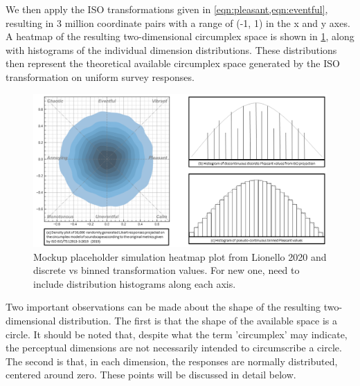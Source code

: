 We then apply the ISO transformations given in \cref{eqn:pleasant,eqn:eventful}, resulting in 3 million coordinate pairs with a range of (-1, 1) in the x and y axes. A heatmap of the resulting two-dimensional circumplex space is shown in \cref{fig:isoheatmap}, along with histograms of the individual dimension distributions. These distributions then represent the theoretical available circumplex space generated by the ISO transformation on uniform survey responses.

\begin{figure}
  \includegraphics[width=\textwidth]{figures/Combined_sim_hist_mockup.png}
  \caption{Mockup placeholder simulation heatmap plot from Lionello 2020 and discrete vs binned transformation values. For new one, need to include distribution histograms along each axis.%
    \label{fig:isoheatmap}
  }
\end{figure}

Two important observations can be made about the shape of the resulting two-dimensional distribution. The first is that the shape of the available space is a circle. It should be noted that, despite what the term 'circumplex' may indicate, the perceptual dimensions are not necessarily intended to circumscribe a circle. The second is that, in each dimension, the responses are normally distributed, centered around zero. These points will be discussed in detail below.

